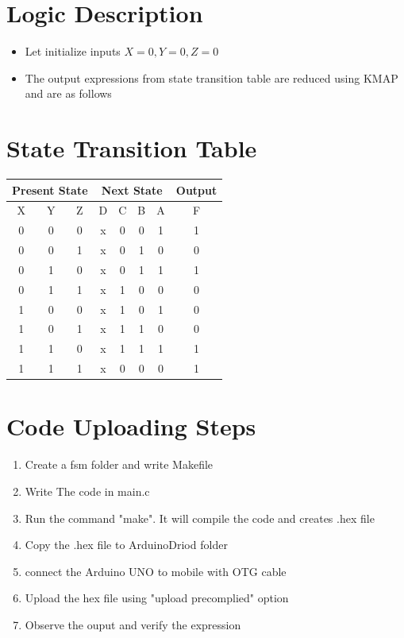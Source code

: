 \documentclass[a4paper,12pt]{article}
\begin{document}
\section*{Logic Description}
\begin{itemize}
        \item Let initialize inputs $X=0,Y=0,Z=0$
        \item The output expressions from state transition table are reduced using KMAP and are as follows
\end{itemize}
\section*{State Transition Table}
\begin{center}
\begin{tabular}{|c|c|c|c|c|c|c|c|}
\hline
        \multicolumn{3}{|c|}{\textbf{Present State}} & \multicolumn{4}{|c|}{\textbf{Next State}} & \textbf{Output} \\ \hline
        X & Y & Z & D & C & B & A & F\\ \hline
        0 & 0 & 0 & x & 0 & 0 & 1 & 1\\
        0 & 0 & 1 & x & 0 & 1 & 0 & 0\\
        0 & 1 & 0 & x & 0 & 1 & 1 & 1\\
        0 & 1 & 1 & x & 1 & 0 & 0 & 0\\
        1 & 0 & 0 & x & 1 & 0 & 1 & 0\\
        1 & 0 & 1 & x & 1 & 1 & 0 & 0\\
        1 & 1 & 0 & x & 1 & 1 & 1 & 1\\
        1 & 1 & 1 & x & 0 & 0 & 0 & 1\\ \hline
\end{tabular}
\end{center}
\section*{Code Uploading Steps}
\begin{enumerate}
        \item Create a fsm folder and write Makefile
        \item Write The code in main.c
        \item Run the command "make". It will compile the code and creates .hex file
        \item Copy the .hex file to ArduinoDriod folder
        \item connect the Arduino UNO to mobile with OTG cable
        \item Upload the hex file using "upload precomplied" option
        \item Observe the ouput and verify the expression
\end{enumerate}
\end{document}
